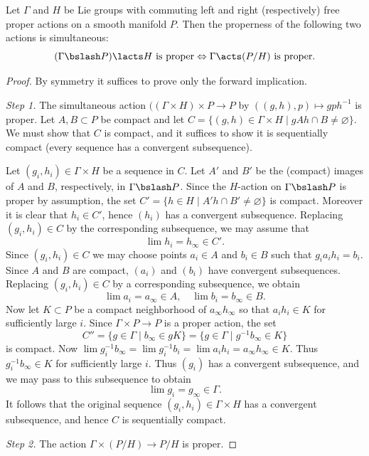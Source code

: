 \begin{lem}\label{lem 3.3.12 Sharpe}
    Let $\Gamma$ and $H$ be Lie groups with commuting left and right  (respectively) free proper actions on a smooth manifold $P$. Then the properness of the following two actions is simultaneous: 
    \[(\Gamma\bslash P)\lacts H\text{ is proper}\Leftrightarrow \Gamma\acts (P\slash H)\text{ is proper}.\]
\end{lem}
\begin{proof}
    By symmetry it suffices to prove only the forward implication. 
    
    \emph{Step 1.} The simultaneous action $((\Gamma\times H)\times P\to P$ by $((g,h),p)\mapsto gph^{-1}$ is proper. Let $A,B\subset P$ be compact and let $C=\{(g,h)\in \Gamma\times H\mid gAh\cap B\neq \varnothing\}$. We must show that $C$ is compact, and it suffices to show it is sequentially compact (every sequence has a convergent subsequence).

    Let $(g_i,h_i)\in\Gamma\times H$ be a sequence in $C$. Let $A'$ and $B'$ be the (compact) images of $A$ and $B$, respectively, in $\Gamma\bslash P$. Since the $H$-action on $\Gamma\bslash P$ is proper by assumption, the set $C'=\{h\in H\mid A'h\cap B'\neq \varnothing\}$ is compact. Moreover it is clear that $h_i\in C'$, hence $(h_i)$ has a convergent subsequence. Replacing $(g_i,h_i)\in C$ by the corresponding subsequence, we may assume that 
    \[\lim h_i=h_\infty\in C'.\]
    Since $(g_i,h_i)\in C$ we may choose points $a_i\in A$ and $b_i\in B$ such that $g_ia_ih_i=b_i$. Since $A$ and $B$ are compact, $(a_i)$ and $(b_i)$ have convergent subsequences. Replacing $(g_i,h_i)\in C$ by a corresponding subsequence, we obtain
    \[\lim a_i=a_\infty\in A,\quad \lim b_i=b_\infty\in B.\]
    Now let $K\subset P$ be a compact neighborhood of $a_\infty h_\infty$ so that $a_ih_i\in K$ for sufficiently large $i$. Since $\Gamma\times P\to P$ is a proper action, the set
    \[C''=\{g\in\Gamma\mid b_\infty\in gK \}=\{g\in\Gamma\mid g^{-1}b_\infty\in K\}\]
    is compact. Now $\lim g_i^{-1}b_\infty=\lim g_i^{-1} b_i=\lim a_i h_i=a_\infty h_\infty\in K$. Thus $g_i^{-1}b_\infty\in K$ for sufficiently large $i$. Thus $(g_i)$ has a convergent subsequence, and we may pass to this subsequence to obtain 
    \[\lim g_i=g_\infty \in\Gamma.\]
    It follows that the original sequence $(g_i,h_i)\in\Gamma\times H$ has a convergent subsequence, and hence $C$ is sequentially compact.

    \emph{Step 2.} The action $\Gamma\times (P\slash H)\to P\slash H$ is proper.


\end{proof}
